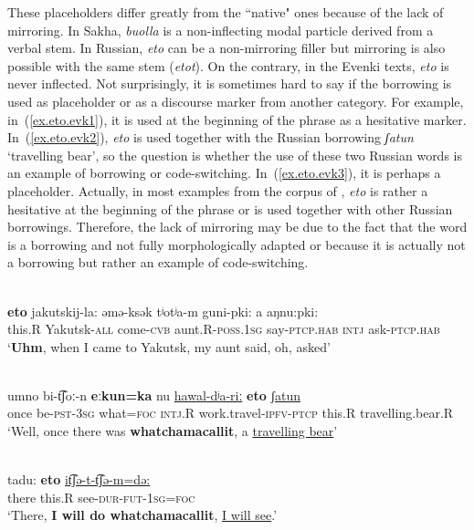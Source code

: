 \documentclass[output=paper,colorlinks,citecolor=brown
\ChapterDOI{10.5281/zenodo.15697577}
]{langscibook}
\begin{document}
These placeholders differ greatly from the ``native" ones because of the lack of mirroring. In Sakha, \textit{buolla} is a non-inflecting modal particle derived from a verbal stem. In Russian, \textit{eto} can be a non-mirroring filler but mirroring is also possible with the same stem (\textit{etot}). On the contrary, in the Evenki texts, \textit{eto} is never inflected. Not surprisingly, it is sometimes hard to say if the borrowing is used as placeholder or as a discourse marker from another category. For example, in~(\ref{ex.eto.evk1}), it is used at the beginning of the phrase as a hesitative marker. In~(\ref{ex.eto.evk2}), \textit{eto} is used together with the Russian borrowing \textit{ʃatun} `travelling bear', so the question is whether the use of these two Russian words is an example of borrowing or code-switching. In~(\ref{ex.eto.evk3}), it is perhaps a placeholder. Actually, in most examples from the corpus of \citep{EvenkiCorpusSiberianLang}, \textit{eto} is rather a hesitative at the beginning of the phrase or is used together with other Russian borrowings. Therefore, the lack of mirroring may be due to the fact that the word is a borrowing and not fully morphologically adapted or because it is actually not a borrowing but rather an example of code-switching.


 \ea \label{ex.eto.evk1}
 \\
 \gll \textbf{eto} jakutskij-la: əmə-ksək tʲotʲa-m guni-pki: a aŋnu:pki:\\
this.R Yakutsk-\textsc{all} come-\textsc{cvb} aunt.R-\textsc{poss.1sg} say-\textsc{ptcp.hab} \textsc{intj} ask-\textsc{ptcp.hab}\\
\glt `\textbf{Uhm}, when I came to Yakutsk, my aunt said, oh, asked' \\
 \z
{}


 \ea \label{ex.eto.evk2}
 \\
 \gll umno bi-t͡ʃoː-n \textbf{eːkun=ka} nu \uline{hawal-dʲa-riː} \textbf{eto} \uline{ʃatun}\\
once be-\textsc{pst}-\textsc{3sg} what=\textsc{foc} \textsc{intj}.R work.travel-\textsc{ipfv}-\textsc{ptcp} this.R travelling.bear.R\\
\glt `Well, once there was \textbf{whatchamacallit}, a \uline{travelling bear}' \\
 \z
{}



 \ea \label{ex.eto.evk3}
\\
 \gll tadu: \textbf{eto} \uline{it͡ʃə-t-t͡ʃə-m=də:}\\
there this.R see-\textsc{dur}-\textsc{fut}-\textsc{1sg}=\textsc{foc}\\
\glt `There, \textbf{I will do whatchamacallit}, \uline{I will see}.' \\
 \z
{} 
\end{document}
